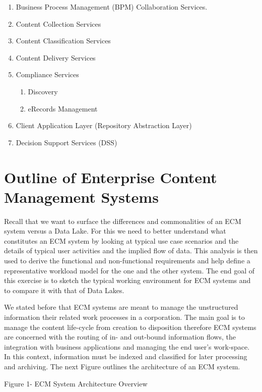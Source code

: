 \begin{enumerate}
\begin{enumerate}
\begin{enumerate}
\item Business Process Management (BPM) Collaboration Services.
\item Content Collection Services
\item Content Classification Services 
\item Content Delivery Services 
\item Compliance Services 
\begin{enumerate}
\item Discovery 
\item eRecords Management
\end{enumerate}
\item Client Application Layer (Repository Abstraction Layer) 
\item Decision Support Services  (DSS)
\end{enumerate}
\end{enumerate}
\end{enumerate}

\section {Outline of Enterprise Content Management Systems}
Recall that we want to surface the differences and commonalities of an ECM system versus a Data Lake. For this we need to better understand what constitutes an ECM system by looking at typical use case scenarios and the details of typical user activities and the implied flow of data. This analysis is then used to derive the functional and non-functional requirements and help define a representative workload model for the one and the other system. The end goal of this exercise is to sketch the typical working environment for ECM systems and to compare it with that of Data Lakes. 

We stated before that ECM systems are meant to manage the unstructured information their related work processes in a corporation. The main goal is to manage the content life-cycle from creation to disposition therefore ECM systems are concerned with the routing of in- and out-bound information flows, the integration with business applications and managing the end user’s work-space. In this context, information must be indexed and classified for later processing and archiving. The next Figure outlines the architecture of an ECM system.


Figure 1- ECM System Architecture Overview

